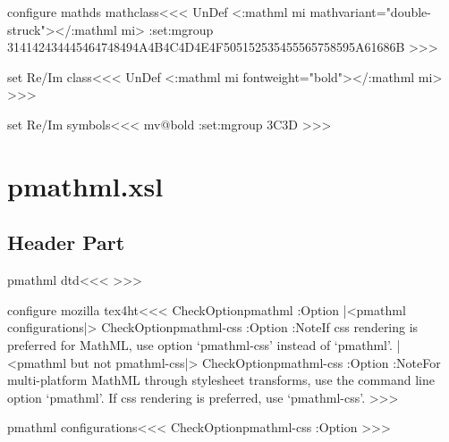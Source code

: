 \<configure mathds mathclass\><<<
\ifx \mathdsMathClass\:UnDef
  \NewMathClass\mathdsMathClass
\fi
{}
    {<\a:mathml mi mathvariant="double-struck">}{</\a:mathml mi>}{}  
\find:set:mgroup{}{\mathdsMathClass}%
   {314142434445464748494A4B4C4D4E4F505152535455565758595A61686B} 
>>>







\<set Re/Im class\><<<
\ifx \mathReImMathClass\:UnDef
  \NewMathClass\mathboldReImMathClass
\fi
{}
    {<\a:mathml mi\Hnewline
         fontweight="bold">}{</\a:mathml mi>}{}  
>>>

\<set Re/Im symbols\><<<
\expandafter\ifx\csname mv@bold\endcsname\relax  \else
\bgroup
{}%
\find:set:mgroup{}{\mathboldReImMathClass}%
  {3C3D}
\egroup
\fi
>>>




\chapter{pmathml.xsl}

\section{Header Part}

\<pmathml dtd\><<<
>>>




\<configure mozilla tex4ht\><<<
\:CheckOption{pmathml} \if:Option
   |<pmathml configurations|>
  \:CheckOption{pmathml-css} \if:Option \else
      \Log:Note{If css rendering is preferred
         for MathML, use option `pmathml-css' instead of `pmathml'.}
      |<pmathml but not pmathml-css|>
  \fi
\else
  \:CheckOption{pmathml-css} \if:Option \else
     \Log:Note{For multi-platform MathML 
       through stylesheet transforms, use the command line option
       `pmathml'. If css rendering is preferred, use `pmathml-css'.}
\fi \fi
>>>


\<pmathml configurations\><<<
\:CheckOption{pmathml-css} \if:Option
    {}
\else
    {}
\fi
>>>

